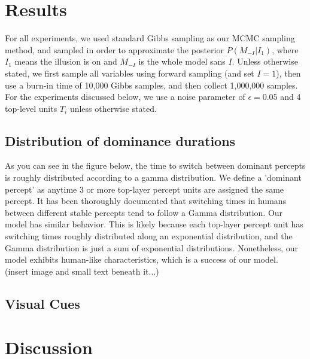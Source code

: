 \documentclass{article} %
\begin{document}
\section{Results}
For all experiments, we used standard Gibbs sampling as our MCMC sampling method, and sampled in order to approximate the posterior $P(M_{-I}|I_1)$, where $I_1$ means the illusion is on and $M_{-I}$ is the whole model sans $I$. Unless otherwise stated, we first sample all variables using forward sampling (and set $I=1$), then use a burn-in time of 10,000 Gibbs samples, and then collect 1,000,000 samples. 
For the experiments discussed below, we use a noise parameter of $\epsilon = 0.05$ and 4 top-level units $T_i$ unless otherwise stated. \\ 



\subsection{Distribution of dominance durations}
As you can see in the figure below, the time to switch between dominant percepts is roughly distributed according to a gamma distribution. We define a 'dominant percept' as anytime 3 or more top-layer percept units are assigned the same percept. It has been thoroughly documented that switching times in humans between different stable percepts tend to follow a Gamma distribution. Our model has similar behavior. This is likely because each top-layer percept unit has switching times roughly distributed along an exponential distribution, and the Gamma distribution is just a sum of exponential distributions. Nonetheless, our model exhibits human-like characteristics, which is a success of our model. \\

(insert image and small text beneath it...)


\subsection{Visual Cues}


\section{Discussion}
\end{document}
